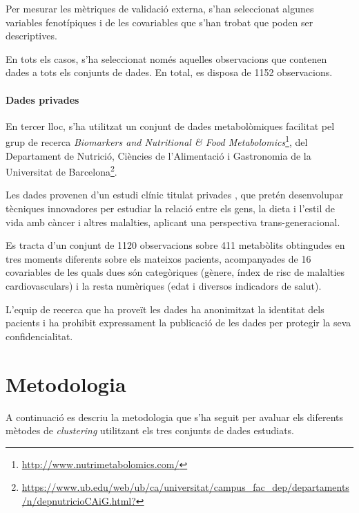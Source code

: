 \documentclass[CAT,BIB]{TFUOC}%
\begin{document}
        Per mesurar les mètriques de validació externa,
        s'han seleccionat algunes variables fenotípiques i de les covariables
        que s'han trobat que poden ser descriptives.

        En tots els casos,
        s'ha seleccionat només aquelles observacions
        que contenen dades a tots els conjunts de dades.
        En total, es disposa de 1152 observacions.

    \paragraph{Dades \acrshort{privades}}
        En tercer lloc,
        s'ha utilitzat un conjunt de dades metabolòmiques
        facilitat pel grup de recerca
        \textit{Biomarkers and Nutritional \& Food Metabolomics}\footnote{\url{http://www.nutrimetabolomics.com/}},
        del Departament de Nutrició, Ciències de l'Alimentació i Gastronomia
        de la Universitat de Barcelona\footnote{\url{https://www.ub.edu/web/ub/ca/universitat/campus_fac_dep/departaments/n/depnutricioCAiG.html?}}.

        Les dades provenen d'un estudi clínic titulat
        \gls{privades} \citep{Petersen2022},
        que pretén desenvolupar tècniques innovadores
        per estudiar la relació entre els gens, la dieta i l'estil de vida
        amb càncer i altres malalties,
        aplicant una perspectiva trans-generacional.

        Es tracta d'un conjunt de 1120 observacions
        sobre 411 metabòlits
        obtingudes en tres moments diferents sobre els mateixos pacients,
        acompanyades de 16 covariables
        de les quals dues són categòriques
        (gènere, índex de risc de malalties cardiovasculars)
        i la resta numèriques
        (edat i diversos indicadors de salut).

        L'equip de recerca que ha proveït les dades
        ha anonimitzat la identitat dels pacients
        i ha prohibit expressament la publicació de les dades
        per protegir la seva confidencialitat.



    \section{Metodologia}
    \label{s:metodologia}

    A continuació es descriu la metodologia que s'ha seguit
    per avaluar els diferents mètodes de \textit{clustering}
    utilitzant els tres conjunts de dades estudiats.
\end{document}
